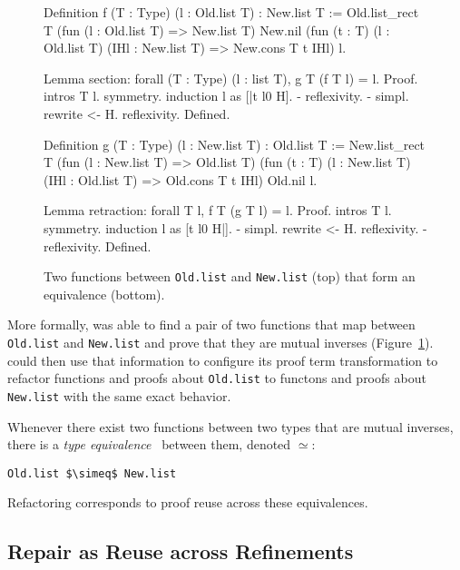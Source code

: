 \begin{figure}
\begin{minipage}{0.46\textwidth}
Definition f (T : Type) (l : Old.list T) : New.list T :=
  Old.list_rect
    T
    (fun (l : Old.list T) => New.list T)
    New.nil
    (fun (t : T) (l : Old.list T) (IHl : New.list T) =>
      New.cons T t IHl)
    l.

Lemma section:
  forall (T : Type) (l : list T), g T (f T l) = l.
Proof.
  intros T l. symmetry. induction l as [|t l0 H].
  - reflexivity.
  - simpl. rewrite <- H. reflexivity.
Defined.
\end{minipage}
\hfill
\begin{minipage}{0.46\textwidth}
Definition g (T : Type) (l : New.list T) : Old.list T :=
  New.list_rect
    T
    (fun (l : New.list T) => Old.list T)
    (fun (t : T) (l : New.list T) (IHl : Old.list T) =>
      Old.cons T t IHl)
    Old.nil
    l.

Lemma retraction:
  forall T l, f T (g T l) = l.
Proof.
  intros T l. symmetry. induction l as [t l0 H|].
  - simpl. rewrite <- H. reflexivity.
  - reflexivity.
Defined.
\end{minipage}
\caption{Two functions between \lstinline{Old.list} and \lstinline{New.list} (top) that form an equivalence (bottom).}
\label{fig:equivalence}
\end{figure}

More formally, \toolname was able to find a pair of two functions that map between \lstinline{Old.list}
and \lstinline{New.list} and prove that they are mutual inverses (Figure~\ref{fig:equivalence}).
\toolname could then use that information to configure its proof term transformation to refactor
functions and proofs about \lstinline{Old.list} to functons and proofs about \lstinline{New.list} with
the same exact behavior.

Whenever there exist two functions between two types that are mutual inverses,
there is a \textit{type equivalence}~\cite{univalent2013homotopy} between them, denoted $\simeq$:

\begin{lstlisting}
Old.list $\simeq$ New.list
\end{lstlisting}
Refactoring corresponds to proof reuse across these equivalences.

\subsection{Repair as Reuse across Refinements}

